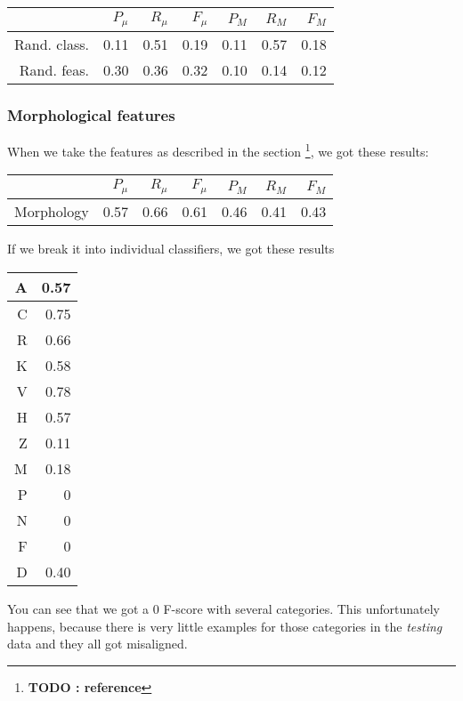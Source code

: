 \documentclass[letterpaper]{article}
\newcommand{\todofn}[1] {
 \footnote{\textbf{TODO : #1}}}
\begin{document}
\begin{tabular}{|r|r|r|r|r|r|r|}
 \hline
 & $P_\mu$ & $R_\mu$ & $F_\mu$ & $P_M$ & $R_M$  & $F_M$ \\ \hline
Rand. class. & 0.11 & 0.51 & 0.19 & 0.11 & 0.57 & 0.18 \\ \hline
Rand. feas. & 0.30 & 0.36 & 0.32 & 0.10 & 0.14 & 0.12 \\ \hline
\end{tabular}

\subsubsection{Morphological features}
When we take the features as described in the section \todofn{reference}, we got these results:


\begin{tabular}{|r|r|r|r|r|r|r|}
 \hline
 & $P_\mu$ & $R_\mu$ & $F_\mu$ & $P_M$ & $R_M$  & $F_M$ \\ \hline
Morphology & 0.57 & 0.66 & 0.61 & 0.46 & 0.41 & 0.43 \\ \hline
\end{tabular}

If we break it into individual classifiers, we got these results


\begin{tabular}{|r|r|}
\hline
A & 0.57 \\ \hline
    C & 0.75 \\ \hline
    R & 0.66 \\ \hline
    K & 0.58 \\ \hline
    V & 0.78 \\ \hline
    H & 0.57 \\ \hline
    Z & 0.11 \\ \hline
    M & 0.18 \\ \hline
    P & 0 \\ \hline
    N & 0 \\ \hline
    F & 0 \\ \hline
    D & 0.40 \\ \hline

\end{tabular}

You can see that we got a 0 F-score with several categories. This unfortunately happens, because there is very little examples for those categories in the \emph{testing} data and they all got misaligned.
\end{document}

